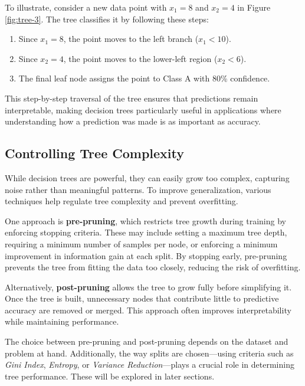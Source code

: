 \documentclass[
  11pt,
]{book}
\providecommand{\tightlist}{%
  \setlength{\itemsep}{0pt}\setlength{\parskip}{0pt}}
\theoremstyle{definition}
\theoremstyle{definition}
\theoremstyle{definition}
\theoremstyle{definition}
\theoremstyle{remark}
\begin{document}
To illustrate, consider a new data point with \(x_1 = 8\) and \(x_2 = 4\) in Figure \ref{fig:tree-3}. The tree classifies it by following these steps:

\begin{enumerate}
\def\labelenumi{\arabic{enumi}.}
\tightlist
\item
  Since \(x_1 = 8\), the point moves to the left branch (\(x_1 < 10\)).\\
\item
  Since \(x_2 = 4\), the point moves to the lower-left region (\(x_2 < 6\)).\\
\item
  The final leaf node assigns the point to Class A with 80\% confidence.
\end{enumerate}

This step-by-step traversal of the tree ensures that predictions remain interpretable, making decision trees particularly useful in applications where understanding how a prediction was made is as important as accuracy.

\subsection*{Controlling Tree Complexity}\label{controlling-tree-complexity}


While decision trees are powerful, they can easily grow too complex, capturing noise rather than meaningful patterns. To improve generalization, various techniques help regulate tree complexity and prevent overfitting.

One approach is \textbf{pre-pruning}, which restricts tree growth during training by enforcing stopping criteria. These may include setting a maximum tree depth, requiring a minimum number of samples per node, or enforcing a minimum improvement in information gain at each split. By stopping early, pre-pruning prevents the tree from fitting the data too closely, reducing the risk of overfitting.

Alternatively, \textbf{post-pruning} allows the tree to grow fully before simplifying it. Once the tree is built, unnecessary nodes that contribute little to predictive accuracy are removed or merged. This approach often improves interpretability while maintaining performance.

The choice between pre-pruning and post-pruning depends on the dataset and problem at hand. Additionally, the way splits are chosen---using criteria such as \emph{Gini Index}, \emph{Entropy}, or \emph{Variance Reduction}---plays a crucial role in determining tree performance. These will be explored in later sections.
\end{document}
